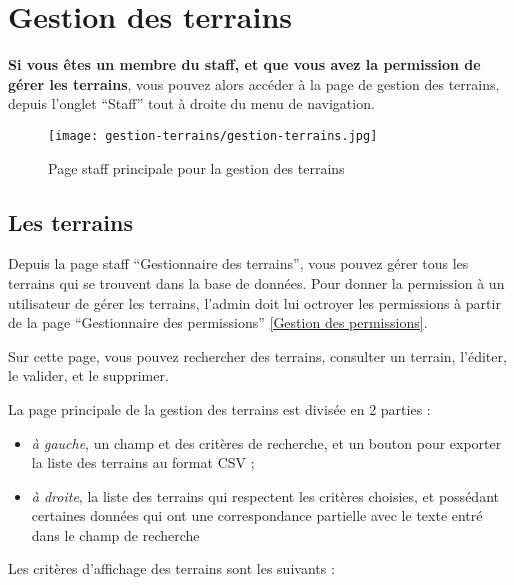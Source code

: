 \section{Gestion des terrains}

\textbf{Si vous êtes un membre du staff, et que vous avez la permission de gérer les terrains}, vous pouvez alors accéder à la page de gestion des terrains, depuis l'onglet \enquote{Staff} tout à droite du menu de navigation.

\begin{figure}[H]
\centering
\texttt{[image: gestion-terrains/gestion-terrains.jpg]}
\caption{Page staff principale pour la gestion des terrains}
\end{figure}

\subsection{Les terrains}

Depuis la page staff \enquote{Gestionnaire des terrains}, vous pouvez gérer tous les terrains qui se trouvent dans la base de données. Pour donner la permission à un utilisateur de gérer les terrains, l'admin doit lui octroyer les permissions à partir de la page \enquote{Gestionnaire des permissions} \ref{Gestion des permissions}.\newline

Sur cette page, vous pouvez rechercher des terrains, consulter un terrain, l'éditer, le valider, et le supprimer.\newline

La page principale de la gestion des terrains est divisée en 2 parties :

\begin{itemize}
\item \textit{à gauche}, un champ et des critères de recherche, et un bouton pour exporter la liste des terrains au format CSV ;
\item \textit{à droite}, la liste des terrains qui respectent les critères choisies, et possédant certaines données qui ont une correspondance partielle avec le texte entré dans le champ de recherche
\end{itemize}
\bigskip

Les critères d'affichage des terrains sont les suivants :

